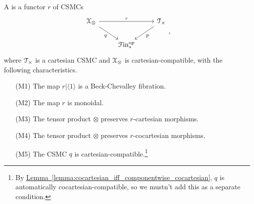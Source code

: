\documentclass[main.tex]{subfiles}
\begin{document}
\begin{definition}
  \label{def:monoidal_beck_chevalley_fibration}
  A  is a functor $r$ of CSMCs
  \begin{equation*}
    \begin{tikzcd}
      \category{X}_{\otimes}
      \arrow[rr, "r"]
      \arrow[dr, swap, "q"]
      && \category{T}_{\times}
      \arrow[dl, "p"]
      \\
      & \Finp\op
    \end{tikzcd},
  \end{equation*}
  where $\mathcal{T}_{\times}$ is a cartesian CSMC and $\mathcal{X}_{\otimes}$ is cartesian-compatible, with the following characteristics.
  \begin{enumerate}
    \item[(M1)] The map $r|\langle 1 \rangle$ is a Beck-Chevalley fibration.

    \item[(M2)] The map $r$ is monoidal.

    \item[(M3)] The tensor product $\otimes$ preserves $r$-cartesian morphisms.

    \item[(M4)] The tensor product $\otimes$ preserves $r$-cocartesian morphisms.

    \item[(M5)] The CSMC $q$ is cartesian-compatible.\footnote{By \hyperref[lemma:cocartesian_iff_componentwise_cocartesian]{Lemma~\ref*{lemma:cocartesian_iff_componentwise_cocartesian}}, $q$ is automatically cocartesian-compatible, so we mustn't add this as a separate condition.}







\end{enumerate}
\end{definition}
\end{document}
